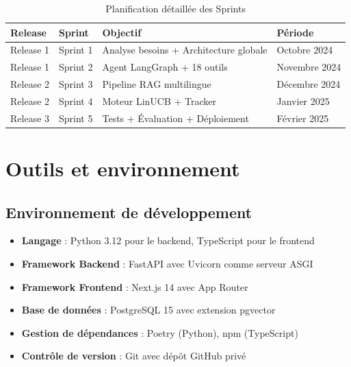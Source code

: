 \begin{table}[H]
    \centering
    \caption{Planification détaillée des Sprints}
    \label{tab:sprint_details}
    \small
    \begin{tabular}{p{1.5cm} p{3cm} p{5cm} p{4cm}}
        \toprule
        \textbf{Release} & \textbf{Sprint} & \textbf{Objectif} & \textbf{Période} \\
        \midrule
        Release 1 & Sprint 1 & Analyse besoins + Architecture globale & Octobre 2024 \\
        Release 1 & Sprint 2 & Agent LangGraph + 18 outils & Novembre 2024 \\
        Release 2 & Sprint 3 & Pipeline RAG multilingue & Décembre 2024 \\
        Release 2 & Sprint 4 & Moteur LinUCB + Tracker & Janvier 2025 \\
        Release 3 & Sprint 5 & Tests + Évaluation + Déploiement & Février 2025 \\
        \bottomrule
    \end{tabular}
\end{table}


\section{Outils et environnement}

\subsection{Environnement de développement}

\begin{itemize}
    \item \textbf{Langage} : Python 3.12 pour le backend, TypeScript pour le frontend
    \item \textbf{Framework Backend} : FastAPI avec Uvicorn comme serveur ASGI
    \item \textbf{Framework Frontend} : Next.js 14 avec App Router
    \item \textbf{Base de données} : PostgreSQL 15 avec extension pgvector
    \item \textbf{Gestion de dépendances} : Poetry (Python), npm (TypeScript)
    \item \textbf{Contrôle de version} : Git avec dépôt GitHub privé
\end{itemize}

